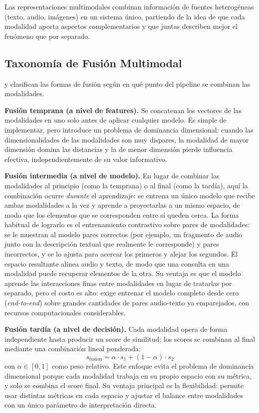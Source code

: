 Las representaciones multimodales combinan información de fuentes heterogéneas (texto, audio, imágenes) en un sistema único, partiendo de la idea de que cada modalidad aporta aspectos complementarios y que juntas describen mejor el fenómeno que por separado.

\subsection{Taxonomía de Fusión Multimodal}
\label{subsec:taxonomia-fusion}

\textcite{baltrusaitis_2019_multimodal} y \textcite{liang_2024_foundations} clasifican las formas de fusión según en qué punto del pipeline se combinan las modalidades.

\textbf{Fusión temprana (a nivel de features).} Se concatenan los vectores de las modalidades en uno solo antes de aplicar cualquier modelo. Es simple de implementar, pero introduce un problema de dominancia dimensional: cuando las dimensionalidades de las modalidades son muy dispares, la modalidad de mayor dimensión domina las distancias y la de menor dimensión pierde influencia efectiva, independientemente de su valor informativo.

\textbf{Fusión intermedia (a nivel de modelo).} En lugar de combinar las modalidades al principio (como la temprana) o al final (como la tardía), aquí la combinación ocurre \textit{durante} el aprendizaje: se entrena un único modelo que recibe ambas modalidades a la vez y aprende a proyectarlas a un mismo espacio, de modo que los elementos que se corresponden entre sí queden cerca. La forma habitual de lograrlo es el entrenamiento contrastivo sobre pares de modalidades: se le muestran al modelo pares correctos (por ejemplo, un fragmento de audio junto con la descripción textual que realmente le corresponde) y pares incorrectos, y se lo ajusta para acercar los primeros y alejar los segundos. El espacio resultante alinea audio y texto, de modo que una consulta en una modalidad puede recuperar elementos de la otra. Su ventaja es que el modelo aprende las interacciones finas entre modalidades en lugar de tratarlas por separado, pero el costo es alto: exige entrenar el modelo completo desde cero (\textit{end-to-end}) sobre grandes cantidades de pares audio-texto ya emparejados, con recursos computacionales considerables.

\textbf{Fusión tardía (a nivel de decisión).} Cada modalidad opera de forma independiente hasta producir un score de similitud; los scores se combinan al final mediante una combinación lineal ponderada:
\begin{equation}
    s_{\text{fusion}} = \alpha \cdot s_1 + (1 - \alpha) \cdot s_2
    \label{eq:fusion-tardia}
\end{equation}
\noindent con $\alpha \in [0, 1]$ como peso relativo. Este enfoque evita el problema de dominancia dimensional porque cada modalidad trabaja en su propio espacio con su métrica, y solo se combina el score final. Su ventaja principal es la flexibilidad: permite usar distintas métricas en cada espacio y ajustar el balance entre modalidades con un único parámetro de interpretación directa.

